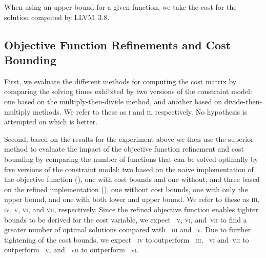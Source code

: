 When using an upper bound for a given \gls{function}, we take the cost for the
\gls{solution} computed by \mbox{\gls{LLVM} 3.8}.


\subsection{Objective Function Refinements and Cost Bounding}

\def\modelA{\textsc{i}}
\def\modelB{\textsc{ii}}

First, we evaluate the different methods for computing the cost matrix by
comparing the solving times exhibited by two versions of the \gls{constraint
  model}: one based on the \gls{multiply-then-divide method}, and another based
on \glspl{divide-then-multiply method}.
%
We refer to these  as \modelA{} and \modelB,
respectively.
%
No hypothesis is attempted on which  is better.

\def\modelC{\textsc{iii}}
\def\modelD{\textsc{iv}}
\def\modelE{\textsc{v}}
\def\modelF{\textsc{vi}}
\def\modelG{\textsc{vii}}

Second, based on the results for the experiment above we then use the superior
method to evaluate the impact of the \gls{objective function} refinement and
cost bounding by comparing the number of \glspl{function} that can be solved
optimally by five versions of the \gls{constraint model}: two based on the naive
implementation of the \gls{objective function}
(), one with cost bounds and one without;
and three based on the refined implementation
(), one without cost
bounds, one with only the upper bound, and one with both lower and upper bound.
%
We refer to these  as \modelC, \modelD, \modelE,
\modelF, and \modelG, respectively.
%
Since the refined \gls{objective function} enables tighter bounds to be derived
for the \gls{cost variable}, we expect ~\modelE,
\modelF, and~\modelG{} to find a greater number of optimal \glspl{solution}
compared with ~\modelC{} and~\modelD.
%
Due to further tightening of the cost bounds, we expect ~\modelD{} to outperform ~\modelC{},
~\modelF{} and~\modelG{} to outperform
~\modelE, and ~\modelG{}
to outperform ~\modelF.

